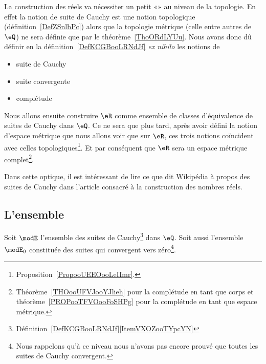 \begin{normaltext}      \label{NormooHRDZooRGGtCd}
    La construction des réels va nécessiter un petit «» au niveau de la topologie. En effet la notion de suite de Cauchy est une notion topologique (définition~\ref{DefZSnlbPc}) alors que la topologie métrique (celle entre autres de \( \eQ\)) ne sera définie que par le théorème~\ref{ThoORdLYUu}. Nous avons donc dû définir en la définition~\ref{DefKCGBooLRNdJf} \emph{ex nihilo} les notions de
\begin{itemize}
    \item
        suite de Cauchy
    \item
        suite convergente
    \item
        complétude
\end{itemize}
Nous allons ensuite construire \( \eR\) comme ensemble de classes d'équivalence de suites de Cauchy dans \( \eQ\). Ce ne sera que plus tard, après avoir défini la notion d'espace métrique que nous allons voir que sur \( \eR\), ces trois notions coïncident avec celles topologiques\footnote{Proposition~\ref{PropooUEEOooLeIImr}.}. Et par conséquent que \( \eR\) sera un espace métrique complet\footnote{Théorème~\ref{THOooUFVJooYJlieh} pour la complétude en tant que corps et théorème~\ref{PROPooTFVOooFoSHPg} pour la complétude en tant que espace métrique.}.

Dans cette optique, il est intéressant de lire ce que dit Wikipédia à propos des suites de Cauchy dans l'article consacré à la construction des nombres réels\cite{BIBooPIGUooHzurMI}.
\end{normaltext}

\subsection{L'ensemble}

Soit \( \modE\) l'ensemble des suites de Cauchy\footnote{Définition~\ref{DefKCGBooLRNdJf}\ref{ItemVXOZooTYpcYN}} dans \( \eQ\). Soit aussi l'ensemble \( \modE_0\) constituée des suites qui convergent vers zéro\footnote{Nous rappelons qu'à ce niveau nous n'avons pas encore prouvé que toutes les suites de Cauchy convergent.}.

